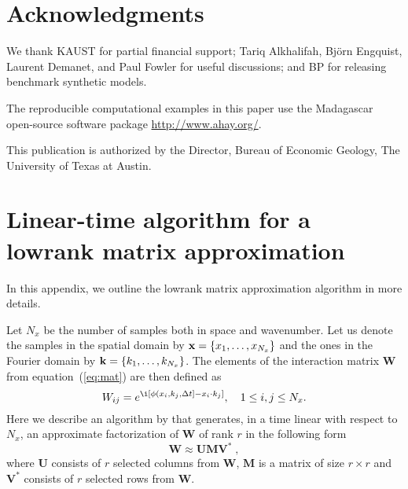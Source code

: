 \section{Acknowledgments}

We thank KAUST for partial financial support; Tariq Alkhalifah,
Bj\"{o}rn Engquist, Laurent Demanet, and Paul Fowler for useful
discussions; and BP for releasing benchmark synthetic models.

The reproducible computational examples in this paper use the
Madagascar open-source software package \url{http://www.ahay.org/}.

This publication is authorized by the Director, Bureau of Economic
Geology, The University of Texas at Austin.

\appendix
\section{Linear-time algorithm for a lowrank matrix approximation}
\label{sec:lowrank}

In this appendix, we outline the lowrank matrix approximation
algorithm in more details.

Let $N_x$ be the number of samples both in space and wavenumber. Let
us denote the samples in the spatial domain by
$\mathbf{x}=\{x_1,\ldots,x_{N_x}\}$ and the ones in the Fourier domain by
$\mathbf{k}=\{k_1,\ldots,k_{N_x}\}$. The elements of the interaction matrix
$\mathbf{W}$ from equation~(\ref{eq:mat}) are then defined as
\begin{equation}
W_{ij} = e^{\i [\phi(x_i,k_j,\Delta t] - x_i \cdot k_j]},\quad
1\le i,j\le N_x.
\label{eq:wij}
\end{equation}
Here we describe an algorithm by \cite{engquistying2009} that
generates, in a time linear with respect to $N_x$, an approximate
factorization of $\mathbf{W}$ of rank $r$ in the following form
\begin{equation}
\mathbf{W} \approx \mathbf{U M V^*}\;,
\label{eq:umv}
\end{equation}
where $\mathbf{U}$ consists of $r$ selected columns from $\mathbf{W}$,
$\mathbf{M}$ is a matrix of size $r\times r$ and $\mathbf{V^*}$ consists of $r$
selected rows from $\mathbf{W}$.

